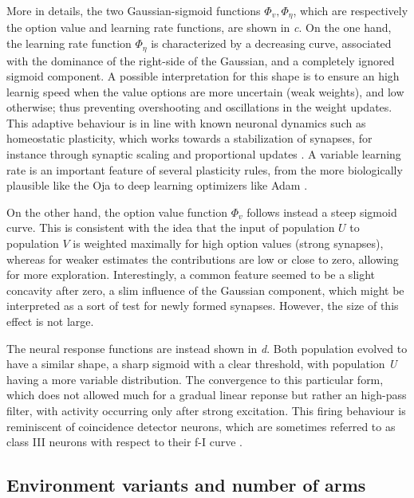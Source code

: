 More in details, the two Gaussian-sigmoid functions $\Phi_{v}, \Phi_{\eta}$, which are respectively the option value and learning rate functions, are shown in \textit{c}.
On the one hand, the learning rate function $\Phi_{\eta}$ is characterized by a decreasing curve, associated with the dominance of the right-side of the Gaussian, and a completely ignored sigmoid component.
A possible interpretation for this shape is to ensure an high learnig speed when the value options are more uncertain (weak weights), and low otherwise; thus preventing overshooting and oscillations in the weight updates.
This adaptive behaviour is in line with known neuronal dynamics such as homeostatic plasticity, which works towards a stabilization of synapses, for instance through synaptic scaling and proportional updates \cite{citriSynapticPlasticityMultiple2008}.
A variable learning rate is an important feature of several plasticity rules, from the more biologically plausible like the Oja \cite{ojaOjaLearningRule2008} to deep learning optimizers like Adam \cite{kingmaAdamMethodStochastic2017}.

On the other hand, the option value function $\Phi_{v}$ follows instead a steep sigmoid curve.
This is consistent with the idea that the input of population $U$ to population $V$ is weighted maximally for high option values (strong synapses), whereas for weaker estimates the contributions are low or close to zero, allowing for more exploration.
Interestingly, a common feature seemed to be a slight concavity after zero, a slim influence of the Gaussian component, which might be interpreted as a sort of test for newly formed synapses. However, the size of this effect is not large.

The neural response functions are instead shown in \textit{d}. Both population evolved to have a similar shape, a sharp sigmoid with a clear threshold, with population \textit{U} having a more variable distribution.
The convergence to this particular form, which does not allowed much for a gradual linear reponse but rather an high-pass filter, with activity occurring only after strong excitation.
This firing behaviour is reminiscent of coincidence detector neurons, which are sometimes referred to as class III neurons with respect to their f-I curve \cite{ratteImpactNeuronalProperties2013}.


\subsection{Environment variants and number of arms}


